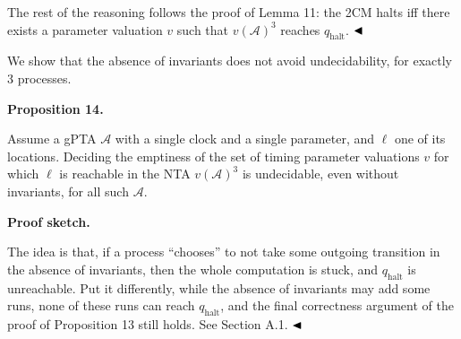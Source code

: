  
 
The rest of the reasoning follows the proof of Lemma 11: the 2CM halts iff there exists a parameter valuation $v$ such that ${v(\mathcal{A})}^{3}$ reaches $q_{\textrm{halt}}$. $\hfill\blacktriangleleft$\par
 
 
 
We show that the absence of invariants does not avoid undecidability, for exactly 3 processes.\par
 
 
 
\par\medskip\noindent\textbf{Proposition 14.}\par
 
 
Assume a gPTA $\mathcal{A}$ with a single clock and a single parameter, and $\mathrm{\ell}$ one of its locations. Deciding the emptiness of the set of timing parameter valuations $v$ for which $\mathrm{\ell}$ is reachable in the NTA ${v(\mathcal{A})}^{3}$ is undecidable, even without invariants, for all such $\mathcal{A}$.\par
 
 
 
 
 
\par\medskip\noindent\textbf{Proof sketch.}\par
 
 
The idea is that, if a process “chooses” to not take some outgoing transition in the absence of invariants, then the whole computation is stuck, and $q_{\textrm{halt}}$ is unreachable. Put it differently, while the absence of invariants may add some runs, none of these runs can reach $q_{\textrm{halt}}$, and the final correctness argument of the proof of Proposition 13 still holds. See Section A.1. $\hfill\blacktriangleleft$\par
 
 
